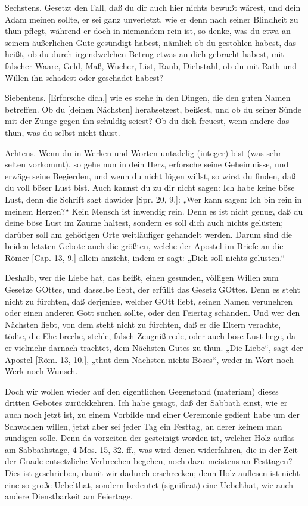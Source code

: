 Sechstens. Gesetzt den Fall, daß du dir auch hier nichts bewußt wärest, und dein Adam meinen sollte, er sei ganz unverletzt, wie er denn nach seiner Blindheit zu thun pflegt, während er doch in niemandem rein ist, so denke, was du etwa an seinem äußerlichen Gute gesündigt habest, nämlich ob du gestohlen habest, das heißt, ob du durch irgendwelchen Betrug etwas an dich gebracht habest, mit falscher Waare, Geld, Maß, Wucher, List, Raub, Diebstahl, ob du mit Rath und Willen ihn schadest oder geschadet habest?

Siebentens. [Erforsche dich,] wie es stehe in den Dingen, die den guten Namen betreffen. Ob du [deinen Nächsten] herabsetzest, beißest, und ob du seiner Sünde mit der Zunge gegen ihn schuldig seiest? Ob du dich freuest, wenn andere das thun, was du selbst nicht thust.

Achtens. Wenn du in Werken und Worten untadelig (integer) bist (was sehr selten vorkommt), so gehe nun in dein Herz, erforsche seine Geheimnisse, und erwäge seine Begierden, und wenn du nicht lügen willst, so wirst du finden, daß du voll böser Lust bist. Auch kannst du zu dir nicht sagen: Ich habe keine böse Lust, denn die Schrift sagt dawider [Spr. 20, 9.]: „Wer kann sagen: Ich bin rein in meinem Herzen?“ Kein Mensch ist inwendig rein. Denn es ist nicht genug, daß du deine böse Lust im Zaume haltest, sondern es soll dich auch nichts gelüsten; darüber soll am gehörigen Orte weitläufiger gehandelt werden. Darum sind die beiden letzten Gebote auch die größten, welche der Apostel im Briefe an die Römer [Cap. 13, 9.] allein anzieht, indem er sagt: „Dich soll nichts gelüsten.“

Deshalb, wer die Liebe hat, das heißt, einen gesunden, völligen Willen zum Gesetze GOttes, und dasselbe liebt, der erfüllt das Gesetz GOttes. Denn es steht nicht zu fürchten, daß derjenige, welcher GOtt liebt, seinen Namen verunehren oder einen anderen Gott suchen sollte, oder den Feiertag schänden. Und wer den Nächsten liebt, von dem steht nicht zu fürchten, daß er die Eltern verachte, tödte, die Ehe breche, stehle, falsch Zeugniß rede, oder auch böse Lust hege, da er vielmehr darnach trachtet, dem Nächsten Gutes zu thun. „Die Liebe“, sagt der Apostel [Röm. 13, 10.], „thut dem Nächsten nichts Böses“, weder in Wort noch Werk noch Wunsch.

Doch wir wollen wieder auf den eigentlichen Gegenstand (materiam) dieses dritten Gebotes zurückkehren. Ich habe gesagt, daß der Sabbath einst, wie er auch noch jetzt ist, zu einem Vorbilde und einer Ceremonie gedient habe um der Schwachen willen, jetzt aber sei jeder Tag ein Festtag, an derer keinem man sündigen solle. Denn da vorzeiten der gesteinigt worden ist, welcher Holz auflas am Sabbathstage, 4 Mos. 15, 32. ff., was wird denen widerfahren, die in der Zeit der Gnade entsetzliche Verbrechen begehen, noch dazu meistens an Festtagen? Dies ist geschrieben, damit wir dadurch erschrecken; denn Holz auflesen ist nicht eine so große Uebelthat, sondern bedeutet (significat) eine Uebelthat, wie auch andere Dienstbarkeit am Feiertage.


